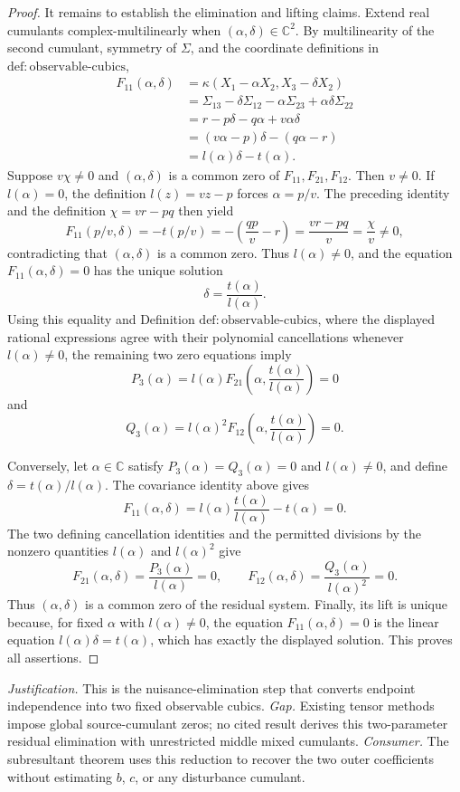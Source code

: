 \documentclass{article}
\begin{document}
\begin{proof}
It remains to establish the elimination and lifting claims.  Extend real cumulants complex-multilinearly when \((\alpha,\delta)\in\mathbb C^2\).  By multilinearity of the second cumulant, symmetry of \(\Sigma\), and the coordinate definitions in \(\mathrm{def:observable\mbox{-}cubics}\),
\[
\begin{aligned}
F_{11}(\alpha,\delta)
&=\kappa(X_1-\alpha X_2,X_3-\delta X_2)\\
&=\Sigma_{13}-\delta\Sigma_{12}-\alpha\Sigma_{23}
  +\alpha\delta\Sigma_{22}\\
&=r-p\delta-q\alpha+v\alpha\delta\\
&=(v\alpha-p)\delta-(q\alpha-r)\\
&=l(\alpha)\delta-t(\alpha).
\end{aligned}
\]
Suppose \(v\chi\neq0\) and \((\alpha,\delta)\) is a common zero of \(F_{11},F_{21},F_{12}\).  Then \(v\neq0\).  If \(l(\alpha)=0\), the definition \(l(z)=vz-p\) forces \(\alpha=p/v\).  The preceding identity and the definition \(\chi=vr-pq\) then yield
\[
F_{11}(p/v,\delta)
=-t(p/v)
=-\left(\frac{qp}{v}-r\right)
=\frac{vr-pq}{v}
=\frac{\chi}{v}\neq0,
\]
contradicting that \((\alpha,\delta)\) is a common zero.  Thus \(l(\alpha)\neq0\), and the equation \(F_{11}(\alpha,\delta)=0\) has the unique solution
\[
\delta=\frac{t(\alpha)}{l(\alpha)}.
\]
Using this equality and Definition \(\mathrm{def:observable\mbox{-}cubics}\), where the displayed rational expressions agree with their polynomial cancellations whenever \(l(\alpha)\neq0\), the remaining two zero equations imply
\[
P_3(\alpha)
=l(\alpha)F_{21}\!\left(\alpha,\frac{t(\alpha)}{l(\alpha)}\right)
=0
\]
and
\[
Q_3(\alpha)
=l(\alpha)^2F_{12}\!\left(\alpha,\frac{t(\alpha)}{l(\alpha)}\right)
=0.
\]

Conversely, let \(\alpha\in\mathbb C\) satisfy \(P_3(\alpha)=Q_3(\alpha)=0\) and \(l(\alpha)\neq0\), and define \(\delta=t(\alpha)/l(\alpha)\).  The covariance identity above gives
\[
F_{11}(\alpha,\delta)
=l(\alpha)\frac{t(\alpha)}{l(\alpha)}-t(\alpha)=0.
\]
The two defining cancellation identities and the permitted divisions by the nonzero quantities \(l(\alpha)\) and \(l(\alpha)^2\) give
\[
F_{21}(\alpha,\delta)
=\frac{P_3(\alpha)}{l(\alpha)}=0,
\qquad
F_{12}(\alpha,\delta)
=\frac{Q_3(\alpha)}{l(\alpha)^2}=0.
\]
Thus \((\alpha,\delta)\) is a common zero of the residual system.  Finally, its lift is unique because, for fixed \(\alpha\) with \(l(\alpha)\neq0\), the equation \(F_{11}(\alpha,\delta)=0\) is the linear equation \(l(\alpha)\delta=t(\alpha)\), which has exactly the displayed solution.  This proves all assertions.
\end{proof}
\par\smallskip\noindent \textit{Justification.} This is the nuisance-elimination step that converts endpoint independence into two fixed observable cubics. \textit{Gap.} Existing tensor methods impose global source-cumulant zeros; no cited result derives this two-parameter residual elimination with unrestricted middle mixed cumulants. \textit{Consumer.} The subresultant theorem uses this reduction to recover the two outer coefficients without estimating \(b\), \(c\), or any disturbance cumulant.
\end{document}
